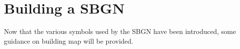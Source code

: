 \chapter{Building a SBGN \PDm}
\label{chp:build}

Now that the various symbols used by the SBGN \PDl have been introduced, some guidance on building map will be provided. 


%
